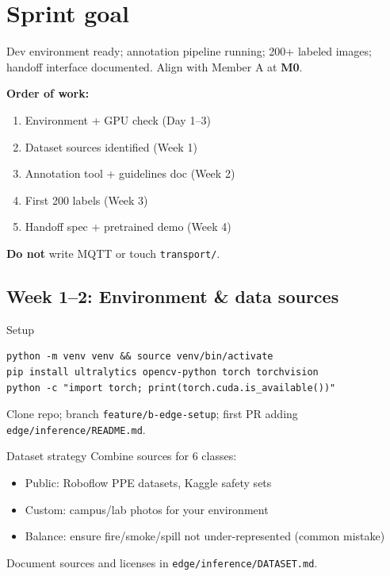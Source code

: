 \documentclass[12pt,a4paper]{report}
\begin{document}
\section{Sprint goal}

Dev environment ready; annotation pipeline running; 200+ labeled images; handoff interface documented. Align with Member A at \textbf{M0}.

\begin{approachbox}
\textbf{Order of work:}
\begin{enumerate}
    \item Environment + GPU check (Day 1--3)
    \item Dataset sources identified (Week 1)
    \item Annotation tool + guidelines doc (Week 2)
    \item First 200 labels (Week 3)
    \item Handoff spec + pretrained demo (Week 4)
\end{enumerate}
\textbf{Do not} write MQTT or touch \texttt{transport/}.
\end{approachbox}

\subsection{Week 1--2: Environment \& data sources}

\begin{stepbox}{Setup}
\begin{verbatim}
python -m venv venv && source venv/bin/activate
pip install ultralytics opencv-python torch torchvision
python -c "import torch; print(torch.cuda.is_available())"
\end{verbatim}
Clone repo; branch \texttt{feature/b-edge-setup}; first PR adding \texttt{edge/inference/README.md}.
\end{stepbox}

\begin{stepbox}{Dataset strategy}
Combine sources for 6 classes:
\begin{itemize}
    \item Public: Roboflow PPE datasets, Kaggle safety sets
    \item Custom: campus/lab photos for your environment
    \item Balance: ensure fire/smoke/spill not under-represented (common mistake)
\end{itemize}
Document sources and licenses in \texttt{edge/inference/DATASET.md}.
\end{stepbox}
\end{document}
